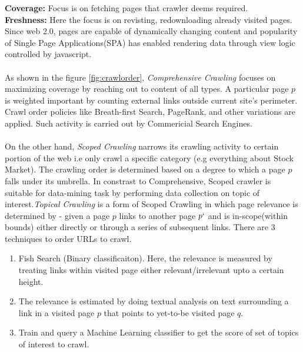 \noindent
\textbf{Coverage:} Focus is on fetching pages that crawler deems required. 
\\
\textbf{Freshness:} Here the focus is on revisting, redownloading already visited pages. Since web 2.0,
pages are capable of dynamically changing content and popularity of Single Page Applications(SPA) has
enabled rendering data through view logic controlled by javascript.
\\
\\
As shown in the figure \ref{fig:crawlorder}, \textit{Comprehensive Crawling}\cite{trends} focuses on maximizing coverage by reaching out to content of all types.
A particular page $p$ is weighted important by counting external links outside current site's perimeter. Crawl order policies like Breath-first Search, PageRank, and other variations are applied. Such activity
is carried out by Commericial Search Engines.
\\
\\
On the other hand, \textit{Scoped Crawling}\cite{trends} narrows its
crawling activity to certain portion of the web i.e only crawl a specific category (e.g everything about Stock Market). The crawling order is determined based on a degree to which a page $p$ falls under its umbrella.
In constrast to Comprehensive, Scoped crawler is suitable for data-mining task by performing
data collection on topic of interest.\textit{Topical Crawling}\cite{trends} is a form of Scoped Crawling in which page relevance is determined by - given a  page $p$ links to another page $p`$ and is in-scope(within bounds) either directly or through a series of subsequent links. There are 3 techniques to order URLs to crawl.

\begin{enumerate}
\item Fish Search (Binary classificaiton). Here, the relevance is measured by treating links within visited
  page either relevant/irrelevant upto a certain height.
\item The relevance is estimated by doing textual analysis on text surrounding a link in a visited page $p$
  that points to yet-to-be visited page $q$.
\item Train and query a Machine Learning classifier to get the score of set of topics of interest to crawl.
\end{enumerate}

